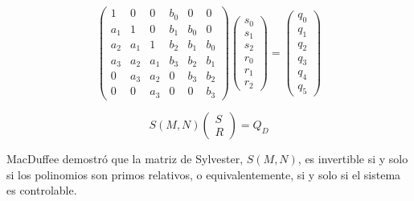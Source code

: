             \begin{equation*}
                \begin{pmatrix}
                    1 & 0 & 0 & b_{0} & 0 & 0 \\
                    a_{1} & 1 & 0 & b_{1} & b_{0} & 0 \\
                    a_{2} & a_{1} & 1 & b_{2} & b_{1} & b_{0} \\
                    a_{3} & a_{2} & a_{1} & b_{3} & b_{2} & b_{1} \\
                    0 & a_{3} & a_{2} & 0 & b_{3} & b_{2} \\
                    0 & 0 & a_{3} & 0 & 0 & b_{3}
                \end{pmatrix}
                \begin{pmatrix}
                    s_0 \\
                    s_1 \\
                    s_2 \\
                    r_0 \\
                    r_1 \\
                    r_2
                \end{pmatrix} =
                \begin{pmatrix}
                    q_0 \\
                    q_1 \\
                    q_2 \\
                    q_3 \\
                    q_4 \\
                    q_5
                \end{pmatrix}
            \end{equation*}

            \begin{equation*}
                S(M, N)
                \begin{pmatrix}
                    S \\
                    R
                \end{pmatrix} =
                Q_D
            \end{equation*}

            MacDuffee demostró que la matriz de Sylvester, $S(M, N)$, es invertible si y solo si los polinomios son primos relativos, o equivalentemente, si y solo si el sistema es controlable.
